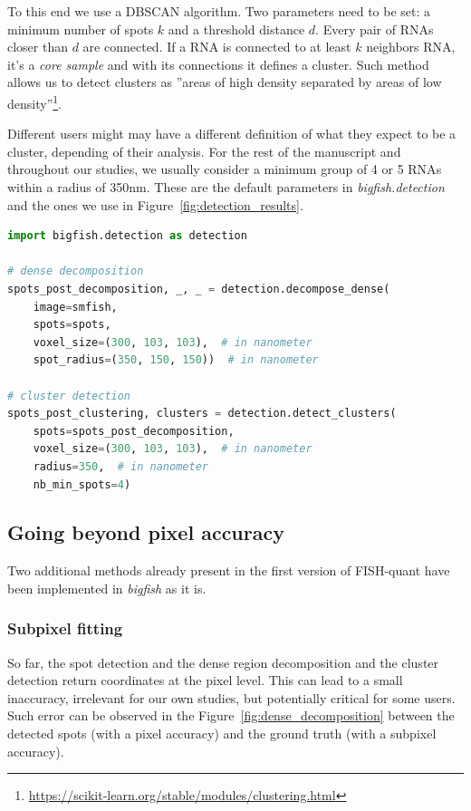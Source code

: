 To this end we use a DBSCAN algorithm\cite{ester_density-based_1996, scikit-learn}.
Two parameters need to be set: a minimum number of spots $k$ and a threshold distance $d$.
Every pair of \ac{RNA}s closer than $d$ are connected.
If a \ac{RNA} is connected to at least $k$ neighbors \ac{RNA}, it's a \emph{core sample} and with its connections it defines a cluster.
Such method allows us to detect clusters as ''areas of high density separated by areas of low density''\footnote{\url{https://scikit-learn.org/stable/modules/clustering.html}}.

Different users might may have a different definition of what they expect to be a cluster, depending of their analysis.
For the rest of the manuscript and throughout our studies, we usually consider a minimum group of 4 or 5 \ac{RNA}s within a radius of 350nm.
These are the default parameters in \emph{bigfish.detection} and the ones we use in Figure~\ref{fig:detection_results}.\\

\begin{minipage}{0.9\textwidth}
\begin{lstlisting}[language=Python]
import bigfish.detection as detection

# dense decomposition
spots_post_decomposition, _, _ = detection.decompose_dense(
    image=smfish,
    spots=spots,
    voxel_size=(300, 103, 103),  # in nanometer
    spot_radius=(350, 150, 150))  # in nanometer

# cluster detection
spots_post_clustering, clusters = detection.detect_clusters(
    spots=spots_post_decomposition,
    voxel_size=(300, 103, 103),  # in nanometer
    radius=350,  # in nanometer
    nb_min_spots=4)
\end{lstlisting}
\end{minipage}

\subsection{Going beyond pixel accuracy}
\label{subsec:subpixel}

Two additional methods already present in the first version of FISH-quant\cite{mueller_fish-quant_2013} have been implemented in \emph{bigfish} as it is.

\subsubsection{Subpixel fitting}

So far, the spot detection and the dense region decomposition and the cluster detection return coordinates at the pixel level.
This can lead to a small inaccuracy, irrelevant for our own studies, but potentially critical for some users.
Such error can be observed in the Figure~\ref{fig:dense_decomposition} between the detected spots (with a pixel accuracy) and the ground truth (with a subpixel accuracy).

